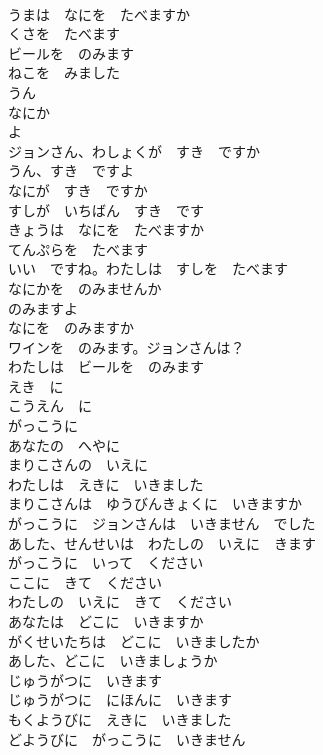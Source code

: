 \documentclass[8pt]{extreport}
\begin{document}
\begin{CJK}{UTF8}{min}
\\	うまは　なにを　たべますか	
\\	くさを　たべます	
\\	ビールを　のみます	
\\	ねこを　みました	
\\	うん	
\\	なにか	
\\	よ	
\\	ジョンさん、わしょくが　すき　ですか	
\\	うん、すき　ですよ	
\\	なにが　すき　ですか	
\\	すしが　いちばん　すき　です	
\\	きょうは　なにを　たべますか	
\\	てんぷらを　たべます	
\\	いい　ですね。わたしは　すしを　たべます	
\\	なにかを　のみませんか	
\\	のみますよ	
\\	なにを　のみますか	
\\	ワインを　のみます。ジョンさんは？	
\\	わたしは　ビールを　のみます	
\\	えき　に	
\\	こうえん　に	
\\	がっこうに	
\\	あなたの　へやに	
\\	まりこさんの　いえに	
\\	わたしは　えきに　いきました	
\\	まりこさんは　ゆうびんきょくに　いきますか	
\\	がっこうに　ジョンさんは　いきません　でした	
\\	あした、せんせいは　わたしの　いえに　きます	
\\	がっこうに　いって　ください	
\\	ここに　きて　ください	
\\	わたしの　いえに　きて　ください	
\\	あなたは　どこに　いきますか	
\\	がくせいたちは　どこに　いきましたか	
\\	あした、どこに　いきましょうか	
\\	じゅうがつに　いきます	
\\	じゅうがつに　にほんに　いきます	
\\	もくようびに　えきに　いきました	
\\	どようびに　がっこうに　いきません	

\end{CJK}
\end{document}
